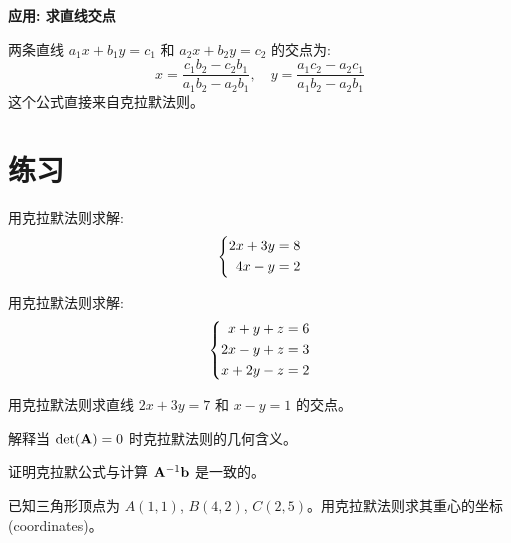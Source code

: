 \begin{practical}
\textbf{应用: 求直线交点}

两条直线 $a_1x + b_1y = c_1$ 和 $a_2x + b_2y = c_2$ 的交点为:
\[
x = \frac{c_1 b_2 - c_2 b_1}{a_1 b_2 - a_2 b_1}, \quad y = \frac{a_1 c_2 - a_2 c_1}{a_1 b_2 - a_2 b_1}
\]
这个公式直接来自克拉默法则。
\end{practical}

\section{练习}

\begin{exercise}
用克拉默法则求解:
\[
\left\{\begin{aligned} 
2x + 3y &= 8 \\
4x - y &= 2
 \end{aligned}\right.
\]
\end{exercise}

\begin{exercise}
用克拉默法则求解:
\[
\left\{\begin{aligned} 
x + y + z &= 6 \\
2x - y + z &= 3 \\
x + 2y - z &= 2
 \end{aligned}\right.
\]
\end{exercise}

\begin{exercise}
用克拉默法则求直线 $2x + 3y = 7$ 和 $x - y = 1$ 的交点。
\end{exercise}

\begin{exercise}
解释当 $\det(\mathbf{A}) = 0$ 时克拉默法则的几何含义。
\end{exercise}

\begin{exercise}[挑战]
证明克拉默公式与计算 $\mathbf{A}^{-1} \mathbf{b}$ 是一致的。
\end{exercise}

\begin{problem}
已知三角形顶点为 $A(1,1)$, $B(4,2)$, $C(2,5)$。用克拉默法则求其重心的坐标 (coordinates)。
\end{problem}
